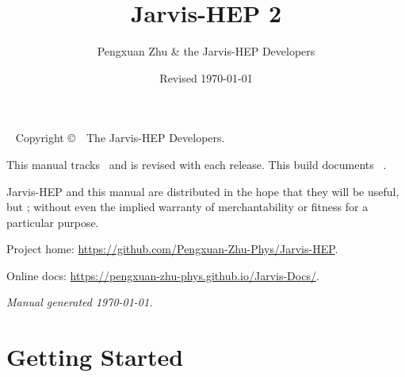 \documentclass[symmetric,openany,nobib]{tufte-book}
\title{Jarvis-HEP 2}
\author{Pengxuan Zhu \& the Jarvis-HEP Developers}
\date{Revised \today}
\let\jorigpart\part
\renewcommand{\part}{\cleardoublepage\jorigpart}
\begin{document}
\frontmatter

\maketitle

\newpage
\begin{fullwidth}
~\vfill
\thispagestyle{empty}
\setlength{\parindent}{0pt}
\setlength{\parskip}{\baselineskip}
\noindent Copyright \copyright\ \the\year\ The Jarvis-HEP Developers.

\par This manual tracks \Jarvis\ and is revised with each release. This build documents
\Jarvis\ \Jversion.

\par{}  Jarvis-HEP and this manual are
distributed in the hope that they will be useful, but ; without even the implied warranty of merchantability or fitness for a
particular purpose.

\par Project home: \url{https://github.com/Pengxuan-Zhu-Phys/Jarvis-HEP}.
\par Online docs: \url{https://pengxuan-zhu-phys.github.io/Jarvis-Docs/}.

\par\textit{Manual generated \today.}
\end{fullwidth}

\tableofcontents
\listoffigures
\listoftables

\cleardoublepage


\mainmatter
\renewcommand{\chaptermark}[1]{\markboth{\thechapter.\ #1}{}}

\part{Getting Started}\label{part:getting-started}




\end{document}
